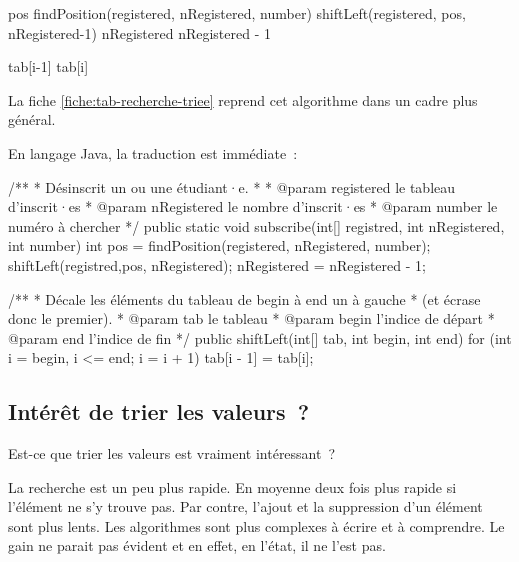 			\begin{pseudocode}
					\Stmt pos \Gets findPosition(registered, nRegistered, number)
					\Stmt shiftLeft(registered, pos, nRegistered-1)
					\Let nRegistered \Gets nRegistered - 1					
				\EndAlgo

				\Empty
						\Let tab[i-1] \Gets tab[i]
					\EndFor
				\EndAlgo
			\end{pseudocode}
			
			La fiche \vref{fiche:tab-recherche-triee} reprend cet algorithme
			dans un cadre plus général.

			En langage Java, la traduction est immédiate~:

			\begin{java}
/**
 * Désinscrit un ou une étudiant·e.
 * 
 * @param registered le tableau d'inscrit·es
 * @param nRegistered le nombre d'inscrit·es
 * @param number le numéro à chercher
 */
public static void subscribe(int[] registred, int nRegistered,
				int number){
	int pos = findPosition(registered, nRegistered, number);
	shiftLeft(registred,pos, nRegistered);
	nRegistered = nRegistered - 1;
}

/**
 * Décale les éléments du tableau de begin à end un à gauche
 * (et écrase donc le premier).
 * @param tab le tableau
 * @param begin l'indice de départ
 * @param end l'indice de fin
 */
public shiftLeft(int[] tab, int begin, int end){
	for (int i = begin, i <= end; i = i + 1){
		tab[i - 1] = tab[i];
	}
}
			\end{java}

		\subsection{Intérêt de trier les valeurs~?}

			Est-ce que trier les valeurs est vraiment intéressant~?
			
			La recherche est un peu plus rapide. En moyenne deux fois plus
			rapide si l'élément ne s'y trouve pas. Par contre, l'ajout et la
			suppression d'un élément sont plus lents.  Les algorithmes sont plus
			complexes à écrire et à comprendre.  Le gain ne parait pas évident
			et en effet, en l’état, il ne l’est pas.
			
